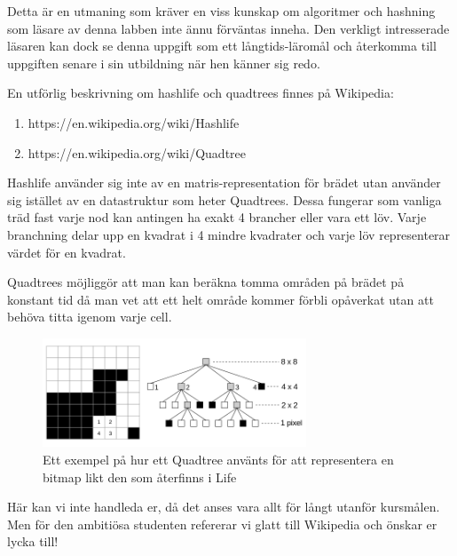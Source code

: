 
    Detta är en utmaning som kräver en viss kunskap om algoritmer och hashning som läsare av denna labben inte ännu förväntas inneha.
    Den verkligt intresserade läsaren kan dock se denna uppgift som ett långtids-läromål och återkomma till uppgiften senare i sin utbildning när
    hen känner sig redo.

    En utförlig beskrivning om hashlife och quadtrees finnes på Wikipedia:
    \begin{enumerate}
        \item https://en.wikipedia.org/wiki/Hashlife
        \item https://en.wikipedia.org/wiki/Quadtree
    \end{enumerate}

        Hashlife använder sig inte av en matris-representation för brädet utan använder sig istället av en datastruktur som heter Quadtrees.
        Dessa fungerar som vanliga träd fast varje nod kan antingen ha exakt 4 brancher eller vara ett löv. Varje branchning delar upp en kvadrat
        i 4 mindre kvadrater och varje löv representerar värdet för en kvadrat.

        Quadtrees möjliggör att man kan beräkna tomma områden på brädet på konstant tid då man vet att ett helt område kommer förbli opåverkat utan
        att behöva titta igenom varje cell.

        \begin{figure}[h]
            \begin{center}
                \includegraphics[width=0.7\textwidth]{../img/w12-lab/quadtree_bitmap.png}
            \end{center}
            \caption{Ett exempel på hur ett Quadtree använts för att representera en bitmap likt den som återfinns i Life}
        \end{figure}


        Här kan vi inte handleda er, då det anses vara allt för långt utanför kursmålen. Men för den ambitiösa studenten refererar vi glatt till Wikipedia och önskar er lycka till!
